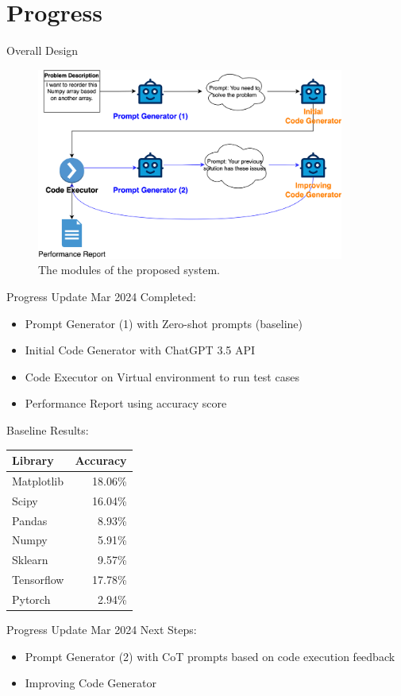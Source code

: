 \section{Progress}

\begin{frame}{Overall Design}
    \begin{figure}[!htb]
        \centering
        \includegraphics[width=0.9\textwidth]{img/selfdebug_design}
        \captionsetup{font=small,labelformat=empty}
        \caption{The modules of the proposed system.}
    \end{figure}
\end{frame}

\begin{frame}{Progress Update  Mar 2024}
    Completed:
    \begin{itemize}
        \item Prompt Generator (1) with Zero-shot prompts (baseline)
        \item Initial Code Generator with ChatGPT 3.5 API
        \item Code Executor on Virtual environment to run test cases
        \item Performance Report using accuracy score
    \end{itemize}

    Baseline Results:
    \begin{tabular}{lr}
        Library    & Accuracy \\
        \hline
        Matplotlib & 18.06\%  \\
        Scipy      & 16.04\%  \\
        Pandas     & 8.93\%   \\
        Numpy      & 5.91\%   \\
        Sklearn    & 9.57\%   \\
        Tensorflow & 17.78\%  \\
        Pytorch    & 2.94\%   \\
    \end{tabular}
\end{frame}

\begin{frame}{Progress Update  Mar 2024}
    Next Steps:
    \begin{itemize}
        \item Prompt Generator (2) with CoT prompts based on code execution feedback
        \item Improving Code Generator
    \end{itemize}
\end{frame}
